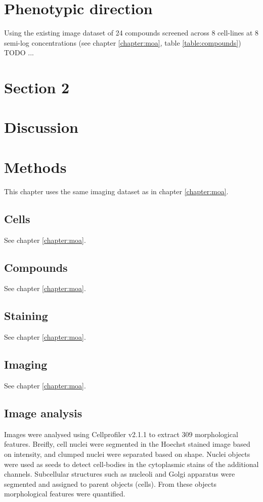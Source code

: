 \documentclass[a4paper,11pt,twoside,openright]{scrbook}
\begin{document}
\section{Phenotypic direction}
Using the existing image dataset of 24 compounds screened across 8 cell-lines at 8 semi-log concentrations (see chapter \ref{chapter:moa}, table \ref{table:compounds}) TODO ...


\section{Section 2}

\section{Discussion}




\section{Methods}

This chapter uses the same imaging dataset as in chapter \ref{chapter:moa}.

\subsection{Cells}
See chapter \ref{chapter:moa}.

\subsection{Compounds}
See chapter \ref{chapter:moa}.

\subsection{Staining}
See chapter \ref{chapter:moa}.

\subsection{Imaging}
See chapter \ref{chapter:moa}.

\subsection{Image analysis}
Images were analysed using Cellprofiler v2.1.1 to extract 309 morphological features.
Breifly, cell nuclei were segmented in the Hoechst stained image based on intensity, and clumped nuclei were separated based on shape.
Nuclei objects were used as seeds to detect cell-bodies in the cytoplasmic stains of the additional channels.
Subcellular structures such as nucleoli and Golgi apparatus were segmented and assigned to parent objects (cells).
From these objects morphological features were quantified.
\end{document}
